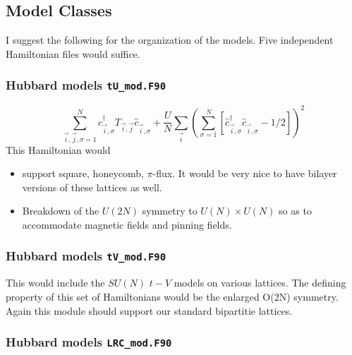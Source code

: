 

\subsection{  Model Classes }

I suggest the following for the organization of the models.    Five independent Hamiltonian   files would suffice.


\subsubsection{Hubbard models   \texttt{tU\_mod.F90}}

\begin{equation}
    \sum_{\vec{i},\vec{j},\sigma=1}^{N}  \hat{c}^{\dagger}_{\vec{i},\sigma } T_{\vec{i},\vec{j}} \hat{c}^{\phantom\dagger}_{\vec{i},\sigma }     +  \frac{U}{N} \sum_{\vec{i}} \left(\sum_{\sigma=1}^{N}  \left[   \hat{c}^{\dagger}_{\vec{i},\sigma } 
    \hat{c}^{\phantom\dagger}_{\vec{i},\sigma }  - 1/2  \right] \right)^2 
\end{equation}
This Hamiltonian would
\begin{itemize} 
\item support   square,  honeycomb,  $\pi$-flux.  It would be very nice to have bilayer versions of these lattices as well. 
\item Breakdown of the $U(2N)$ symmetry to $U(N) \times U(N)$ so as to accommodate magnetic fields and pinning fields.  
\end{itemize}


\subsubsection{Hubbard models   \texttt{tV\_mod.F90}}

This would include the $SU(N)$  $t-V$ models on various lattices.  The defining property of this set of Hamiltonians would be the enlarged O(2N) symmetry.  Again  this   module should support our standard bipartitie lattices. 


\subsubsection{Hubbard models   \texttt{LRC\_mod.F90}}

